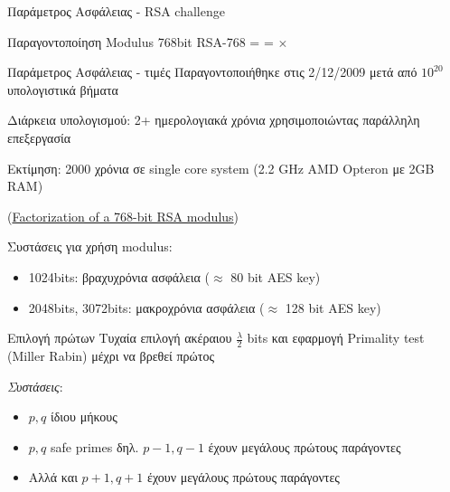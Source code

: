 \documentclass[handout]{beamer}
\begin{document}
\begin{frame}{Παράμετρος Ασφάλειας - RSA challenge}
\begin{block}{Παραγοντοποίηση Modulus 768bit}
RSA-768 = 
	 =
	$\times$
	\alert{}
\end{block}
\end{frame}

\begin{frame}{Παράμετρος Ασφάλειας - τιμές}
Παραγοντοποιήθηκε στις 2/12/2009 μετά από $10^{20}$ υπολογιστικά βήματα \pause

Διάρκεια υπολογισμού: 2+ ημερολογιακά χρόνια χρησιμοποιώντας παράλληλη επεξεργασία \pause

Εκτίμηση: 2000 χρόνια σε single core system (2.2 GHz AMD Opteron με 2GB RAM) \pause

(\href{http://eprint.iacr.org/2010/006}{Factorization of a 768-bit RSA modulus})

\pause
Συστάσεις για χρήση modulus:
\begin{itemize}
\item 1024bits: βραχυχρόνια ασφάλεια ($\approx$ 80 bit AES key)
\item 2048bits, 3072bits: μακροχρόνια ασφάλεια ($\approx$ 128 bit AES key)
\end{itemize}
\end{frame}

\begin{frame}{Επιλογή πρώτων}
Τυχαία επιλογή ακέραιου $\frac{\lambda}{2}$ bits και εφαρμογή Primality test (Miller Rabin) μέχρι να βρεθεί πρώτος

\emph{Συστάσεις}:
\begin{itemize}
\item $p, q$ ίδιου μήκους
\item $p,q$ safe primes δηλ. $p-1,q-1$ έχουν μεγάλους πρώτους παράγοντες
\item Αλλά και $p+1,q+1$ έχουν μεγάλους πρώτους παράγοντες
\end{itemize}
\end{frame}
\end{document}
